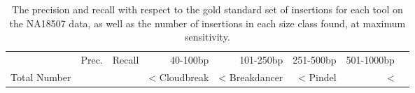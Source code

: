 \begin{table}[t]
\begin{center}
\begin{tabular}{rrr|rrrrr}
  \hline
 & Prec. & Recall & 40-100bp & 101-250bp & 251-500bp & 501-1000bp \\ 
Total Number & & & <%
  \hline
Cloudbreak & <%
Breakdancer & <%
  Pindel & <%
   \hline
\end{tabular}
\end{center}
\caption{The precision and recall with respect to the gold standard set of insertions for each tool on the NA18507 data, as well as the number of insertions in each size class found, at maximum sensitivity.}
\label{NA18507InsertionPreds}
\end{table}
